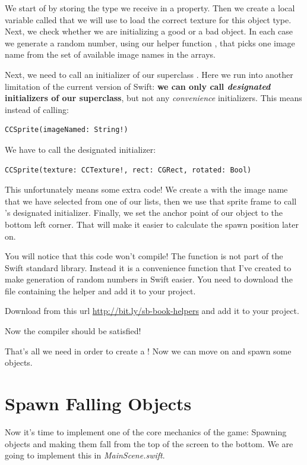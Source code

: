 We start of by storing the type we receive in a property.
Then we create a local variable called  that we will use
to load the correct texture for this object type. Next, we check whether we are
initializing a good or a bad object. In each case we generate a random number,
using our helper function , that picks one image name
from the set of available image names in the arrays. 

Next, we need to call an initializer of our superclass \ccsprite{}. Here we run
into another limitation of the current version of Swift: \textbf{we can only
call \textit{designated} initializers of our superclass}, but not any
\textit{convenience} initializers. This means instead of calling:
\begin{lstlisting}
CCSprite(imageNamed: String!)
\end{lstlisting}
We have to call the designated initializer:
\begin{lstlisting}
CCSprite(texture: CCTexture!, rect: CGRect, rotated: Bool)
\end{lstlisting}
This unfortunately means some extra code! We create a 
with the image name that we have selected from one of our lists, then we use
that sprite frame to call \ccsprite{}'s designated initializer. Finally, we set
the anchor point of our object to the bottom left corner. That will make it
easier to calculate the spawn position later on.

You will notice that this code won't compile! The 
function is not part of the Swift standard library. Instead it is a convenience
function that I've created to make generation of random numbers in Swift easier.
You need to download the file containing the helper and add it to your project.

\begin{leftbar}
Download  from this url
\url{http://bit.ly/sb-book-helpers}
and add it to your project.
\end{leftbar}

Now the compiler should be satisfied!

That's all we need in order to create a ! Now we
can move on and spawn some objects.

\section{Spawn Falling Objects}
Now it's time to implement one of the core mechanics of the game: Spawning
objects and making them fall from the top of the screen to the bottom. We are
going to implement this in \textit{MainScene.swift}. 

